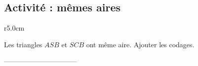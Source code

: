 
\subsection*{Activité : mêmes aires}

\begin{wrapfigure}[1]{r}{5.0cm}
   \vspace{-0.5cm}        %
   \centering
   
\end{wrapfigure}

Les triangles \( ASB\) et \( SCB\) ont même aire. Ajouter les codages.

\vspace{3cm}
--------------------------------
